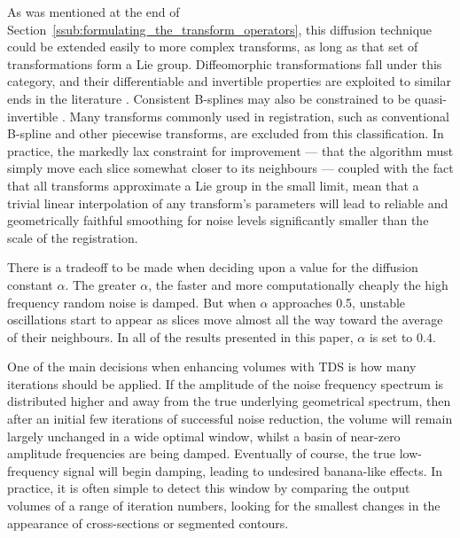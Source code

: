   As was mentioned at the end of Section~\ref{ssub:formulating_the_transform_operators}, this diffusion technique could be extended easily to more complex transforms, as long as that set of transformations form a Lie group. Diffeomorphic transformations fall under this category, and their differentiable and invertible properties are exploited to similar ends in the literature \cite{Avants2006}. Consistent B-splines may also be constrained to be quasi-invertible \cite{Arganda-Carreras2010}. Many transforms commonly used in registration, such as conventional B-spline and other piecewise transforms, are excluded from this classification. In practice, the markedly lax constraint for improvement --- that the algorithm must simply  move each slice somewhat closer to its neighbours --- coupled with the fact that all transforms approximate a Lie group in the small limit, mean that a trivial linear interpolation of any transform's parameters will lead to reliable and geometrically faithful smoothing for noise levels significantly smaller than the scale of the registration.
    
	There is a tradeoff to be made when deciding upon a value for the diffusion constant $\alpha$. The greater $\alpha$, the faster and more computationally cheaply the high frequency random noise is damped. But when $\alpha$ approaches 0.5, unstable oscillations start to appear as slices move almost all the way toward the average of their neighbours. In all of the results presented in this paper, $\alpha$ is set to $0.4$.

  One of the main decisions when enhancing volumes with TDS is how many iterations should be applied. If the amplitude of the noise frequency spectrum is distributed higher and away from the true underlying geometrical spectrum, then after an initial few iterations of successful noise reduction, the volume will remain largely unchanged in a wide optimal window, whilst a basin of near-zero amplitude frequencies are being damped. Eventually of course, the true low-frequency signal will begin damping, leading to undesired banana-like effects. In practice, it is often simple to detect this window by comparing the output volumes of a range of iteration numbers, looking for the smallest changes in the appearance of cross-sections or segmented contours.
  
